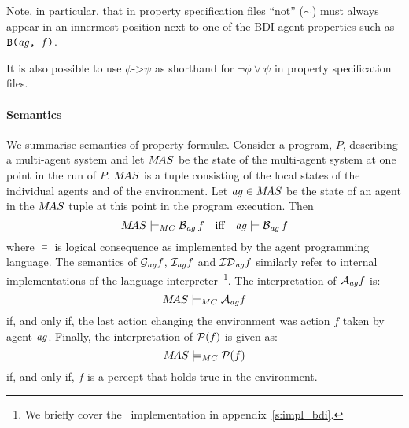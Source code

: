 Note, in particular, that in property specification files ``not'' ($\sim$) must always appear in an innermost position next to one of the BDI agent properties such as $\texttt{B(}\mathit{ag}\texttt{, }f\texttt{)}$.  

It is also possible to use $\phi \texttt{->} \psi$ as shorthand for $\neg \phi \vee \psi$ in property specification files.

\medskip

\paragraph{Semantics}
We summarise semantics of property formul\ae{}.
Consider a program, $P$, describing a multi-agent system and let
$M\!AS$ be the state of the multi-agent system at one point in the run
of $P$.  $M\!AS$ is a tuple consisting of the local states of the individual agents and of the environment. Let $\mathit{ag} \in M\!AS$ be the state of an agent in the $M\!AS$ tuple at this point in the 
program execution. Then 
$$
M\!AS \models_{MC} \mathrm{{\cal B}}_{\mathit{ag}} \, f \text{\quad iff\quad }
\mathit{ag} \models  \mathrm{{\cal B}}_{\mathit{ag}} \, f
$$
where $\models$ is logical consequence as implemented by the agent
programming language. The semantics of $\mathrm{{\cal G}}_{\mathit{ag}} f$, $\mathrm{{\cal I}}_{\mathit{ag}} f$ and $\mathrm{{\cal ID}}_{\mathit{ag}} f$ similarly refer to internal implementations of the language interpreter~\footnote{We briefly cover the \gwendolen\ implementation in appendix~\ref{s:impl_bdi}.}.  
The interpretation of $\mathrm{{\cal A}}_{\mathit{ag}} f$ is:
$$M\!AS \models_{MC}
\mathrm{{\cal A}}_{\mathit{ag}} f$$ if, and only if, the last action changing
the environment was action $f$ taken by agent $\mathit{ag}$.  Finally, the interpretation of
$\mathrm{{\cal P}}(f)$ is given as:
$$M\!AS
\models_{MC} \mathrm{{\cal P}}(f)$$ if, and only if, $f$ is a percept that
holds true in the environment.
\medskip

